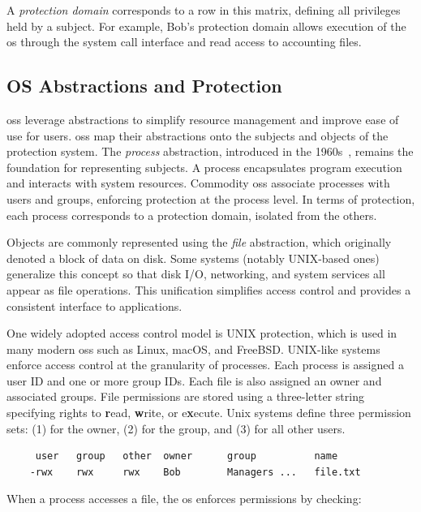 A \emph{protection domain} corresponds to a row in this matrix, defining all privileges held by a subject.
For example, Bob's protection domain allows execution of the \gls{os} through the system call interface and read access to accounting files.

\subsection{OS Abstractions and Protection}

\glspl{os} leverage abstractions to simplify resource management and improve ease of use for users.
\glspl{os} map their abstractions onto the subjects and objects of the protection system.
The \emph{process} abstraction, introduced in the 1960s~\cite{denning2022systems}, remains the foundation for representing subjects.
A process encapsulates program execution and interacts with system resources.
Commodity \glspl{os} associate processes with users and groups, enforcing protection at the process level.
In terms of protection, each process corresponds to a protection domain, isolated from the others.

Objects are commonly represented using the \emph{file} abstraction, which originally denoted a block of data on disk.
Some systems (notably UNIX-based ones) generalize this concept so that disk I/O, networking, and system services all appear as file operations.
This unification simplifies access control and provides a consistent interface to applications.


One widely adopted access control model is UNIX protection, which is used in many modern \glspl{os} such as Linux, macOS, and FreeBSD.
UNIX-like systems enforce access control at the granularity of processes.
Each process is assigned a user ID and one or more group IDs.
Each file is also assigned an owner and associated groups.
File permissions are stored using a three-letter string specifying rights to \textbf{r}ead, \textbf{w}rite, or e\textbf{x}ecute.
Unix systems define three permission sets: (1) for the owner, (2) for the group, and (3) for all other users.

\begin{verbatim}
     user   group   other  owner      group          name
    -rwx    rwx     rwx    Bob        Managers ...   file.txt
\end{verbatim}

When a process accesses a file, the \gls{os} enforces permissions by checking:

